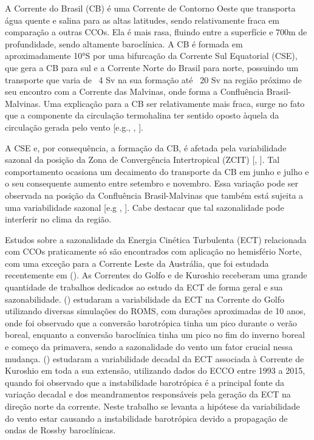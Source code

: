 \documentclass[portuguese,12pt,a4paper]{article}
\begin{document}
A Corrente do Brasil (CB) é uma Corrente de Contorno Oeste que transporta água quente e salina para as altas latitudes, sendo relativamente fraca em comparação a outras CCOs. Ela é mais rasa, fluindo entre a superfície e 700m de profundidade, sendo altamente baroclínica. A CB é formada em aproximadamente 10°S por uma bifurcação da Corrente Sul Equatorial (CSE), que gera a CB para sul e a Corrente Norte do Brasil para norte, possuindo um transporte que varia de ~4 Sv na sua formação até ~20 Sv na região próximo de seu encontro com a Corrente das Malvinas, onde forma a Confluência Brasil-Malvinas. Uma explicação para a CB ser relativamente mais fraca, surge no fato que a componente da circulação termohalina ter sentido oposto àquela da circulação gerada pelo vento [e.g., , \citeyear{silveira2000corrente}].

A CSE e, por consequência, a formação da CB, é afetada pela variabilidade sazonal da
posição da Zona de Convergência Intertropical (ZCIT) [, \citeyear{rodrigues2007seasonal}]. Tal comportamento ocasiona um decaimento do transporte da CB em junho e julho e o seu consequente aumento entre setembro e novembro. Essa variação pode ser observada
na posição da Confluência Brasil-Malvinas que também está sujeita a uma variabilidade
sazonal [e.g , \citeyear{de2019driving}]. Cabe destacar que tal sazonalidade pode interferir no clima da região.

Estudos sobre a sazonalidade da Energia Cinética Turbulenta (ECT) relacionada com CCOs praticamente só são encontrados com aplicação no hemisfério Norte, com uma exceção para a Corrente Leste da Austrália, que foi estudada recentemente em  (\citeyear{liu2022}). As Correntes do Golfo e de Kuroshio receberam uma grande quantidade de trabalhos dedicados ao estudo da ECT de forma geral e sua sazonabilidade.  (\citeyear{kang2016seasonal}) estudaram a variabilidade da ECT na Corrente do Golfo utilizando diversas simulações do ROMS, com durações aproximadas de 10 anos, onde foi observado que a conversão barotrópica tinha um pico durante o verão boreal, enquanto a conversão baroclínica tinha um pico no fim do inverno boreal e começo da primavera, sendo a sazonalidade do vento um fator crucial nessa mudança.  (\citeyear{yang2017decadal}) estudaram a variabilidade decadal da ECT associada à Corrente de Kuroshio em toda a sua extensão, utilizando dados do ECCO entre 1993 a 2015, quando foi observado que a instabilidade barotrópica é a principal fonte da variação decadal e dos meandramentos responsáveis pela geração da ECT na direção norte da corrente. Neste trabalho se levanta a hipótese da variabilidade do vento estar causando a instabilidade barotrópica devido a propagação de ondas de Rossby baroclínicas.
\end{document}
